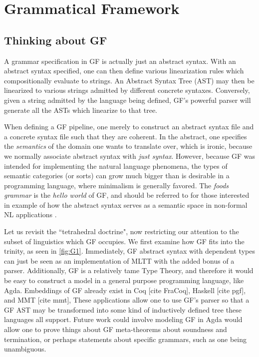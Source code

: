 \section{Grammatical Framework}

\subsection{Thinking about GF}

A grammar specification in GF is actually just an abstract syntax. With an abstract
syntax specified, one can then define various linearization rules which
compositionally evaluate to strings. An Abstract Syntax Tree (AST) may then be
linearized to various strings admitted by different concrete syntaxes.
Conversely, given a string admitted by the language being defined, GF's powerful
parser will generate all the ASTs which linearize to that tree.

When defining a GF pipeline, one merely to construct an abstract syntax file and a
concrete syntax file such that they are coherent. In the abstract, one
specifies the \emph{semantics} of the domain one wants to translate over, which
is ironic, because we normally associate abstract syntax with \emph{just syntax}.
However, because GF was intended for implementing the natural language
phenomena, the types of semantic categories (or sorts) can grow much bigger than is
desirable in a programming language, where minimalism is generally favored.  The
\emph{foods grammar} is the \emph{hello world} of GF, and should be referred to
for those interested in example of how the abstract syntax serves as a semantic
space in non-formal NL applications \cite{ranta2011grammatical}.

Let us revisit the ``tetrahedral doctrine", now restricting our attention to the
subset of linguistics which GF occupies. We first examine how GF fits into the
trinity, as seen in  \autoref{fig:G1}. Immediately, GF abstract syntax with
dependent types can just be seen as an
implementation of MLTT with the added bonus of a parser.  Additionally, GF is a
relatively tame Type Theory, and therefore it would be easy to construct a model
in a general purpose programming language, like Agda.  Embeddings of GF already
exist in Coq [cite FraCoq], Haskell [cite pgf], and MMT [cite mmt],  These applications allow one to use GF's
parser so that a GF AST may be transformed into some kind of
inductively defined tree these languages all support. Future work could involve
modeling GF in Agda would allow one to prove things about GF
meta-theorems about soundness and termination, or perhaps statements about
specific grammars, such as one being unambiguous.

